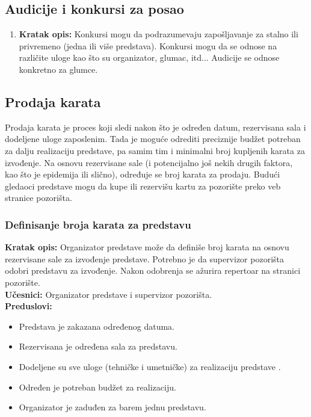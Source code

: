\documentclass[a4paper]{article}
\begin{document}
\subsection{Audicije i konkursi za posao}
\begin{enumerate}
  \item \textbf{Kratak opis:} Konkursi mogu da podrazumevaju zapošljavanje za stalno ili privremeno
        (jedna ili više predstava). Konkursi mogu da se odnose na različite uloge kao što su
        organizator, glumac, itd... Audicije se odnose konkretno za glumce.
\end{enumerate}
 
\subsection{Prodaja karata}
Prodaja karata je proces koji sledi nakon što je određen datum, rezervisana sala i dodeljene uloge
zaposlenim. Tada je moguće odrediti preciznije budžet potreban za dalju realizaciju predstave, pa
samim tim i minimalni broj kupljenih karata za izvođenje. Na osnovu rezervisane sale (i potencijalno još 
nekih drugih faktora, kao što je epidemija ili slično), određuje se broj karata za prodaju. Budući
gledaoci predstave mogu da kupe ili rezervišu kartu za pozorište preko veb stranice pozorišta.

\subsubsection{Definisanje broja karata za predstavu}
\noindent\textbf{Kratak opis:} Organizator predstave može da definiše broj karata na osnovu rezervisane
sale za izvođenje predstave. Potrebno je da supervizor pozorišta odobri predstavu za izvođenje. 
Nakon odobrenja se ažurira repertoar na stranici pozorište.\\

\noindent\textbf{Učesnici:} Organizator predstave i supervizor pozorišta.\\

\noindent\textbf{Preduslovi:}
  \begin{itemize}
    \item Predstava je zakazana određenog datuma.
    \item Rezervisana je određena sala za predstavu.
    \item Dodeljene su sve uloge (tehničke i umetničke) za realizaciju predstave .
    \item Određen je potreban budžet za realizaciju.
    \item Organizator je zaduđen za barem jednu predstavu.
  \end{itemize}
\end{document}
